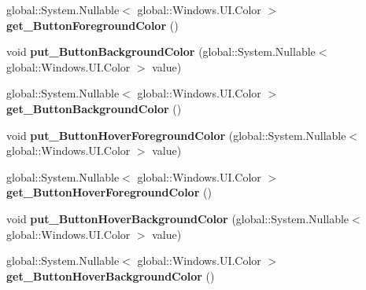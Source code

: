 \begin{DoxyCompactItemize}
global\+::\+System.\+Nullable$<$ global\+::\+Windows.\+U\+I.\+Color $>$ {\bfseries get\+\_\+\+Button\+Foreground\+Color} ()
\item 
\mbox{\label{class_windows_1_1_u_i_1_1_view_management_1_1_application_view_title_bar_a4bf81ad5fba26dac4114c2caf024a7a9}} 
void {\bfseries put\+\_\+\+Button\+Background\+Color} (global\+::\+System.\+Nullable$<$ global\+::\+Windows.\+U\+I.\+Color $>$ value)
\item 
\mbox{\label{class_windows_1_1_u_i_1_1_view_management_1_1_application_view_title_bar_a7e47596433a77023cf07c95e096f0a1c}} 
global\+::\+System.\+Nullable$<$ global\+::\+Windows.\+U\+I.\+Color $>$ {\bfseries get\+\_\+\+Button\+Background\+Color} ()
\item 
\mbox{\label{class_windows_1_1_u_i_1_1_view_management_1_1_application_view_title_bar_a81367f4399734083a0312e932602d91a}} 
void {\bfseries put\+\_\+\+Button\+Hover\+Foreground\+Color} (global\+::\+System.\+Nullable$<$ global\+::\+Windows.\+U\+I.\+Color $>$ value)
\item 
\mbox{\label{class_windows_1_1_u_i_1_1_view_management_1_1_application_view_title_bar_abb2bd226eff90e756e30fce411565e04}} 
global\+::\+System.\+Nullable$<$ global\+::\+Windows.\+U\+I.\+Color $>$ {\bfseries get\+\_\+\+Button\+Hover\+Foreground\+Color} ()
\item 
\mbox{\label{class_windows_1_1_u_i_1_1_view_management_1_1_application_view_title_bar_aab71134c8d012975419633c926f62d40}} 
void {\bfseries put\+\_\+\+Button\+Hover\+Background\+Color} (global\+::\+System.\+Nullable$<$ global\+::\+Windows.\+U\+I.\+Color $>$ value)
\item 
\mbox{\label{class_windows_1_1_u_i_1_1_view_management_1_1_application_view_title_bar_ad8730e54e00f186ed98dfd21d624e119}} 
global\+::\+System.\+Nullable$<$ global\+::\+Windows.\+U\+I.\+Color $>$ {\bfseries get\+\_\+\+Button\+Hover\+Background\+Color} ()

\end{DoxyCompactItemize}
